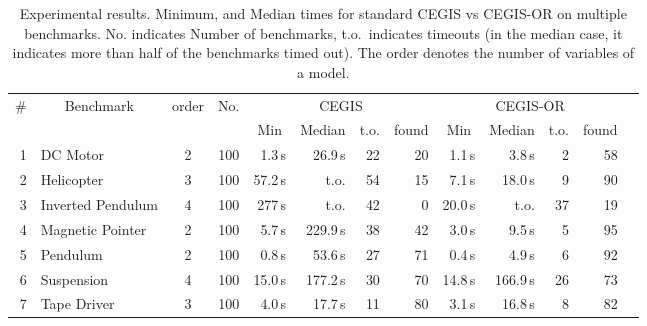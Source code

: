 \documentclass[sigconf]{llncs}
\begin{document}
\begin{table}
\centering
\footnotesize
%
\begin{tabular}{| r | l | c | c | r | r | r | r | r | r | r | r | r |}
%
\hline
\# & \multicolumn{1}{|c|}{Benchmark} & \multicolumn{1}{|c|}{order} & \multicolumn{1}{|c|}{No.} & \multicolumn{4}{|c|}{CEGIS} & \multicolumn{4}{|c|}{CEGIS-OR} \\
   &                                 & & \multicolumn{1}{|c|}{}  & \multicolumn{1}{|c|}{Min} & \multicolumn{1}{|c|}{Median} & \multicolumn{1}{|c|}{t.o.} & \multicolumn{1}{|c|}{found} & \multicolumn{1}{|c|}{Min} & \multicolumn{1}{|c|}{Median} & \multicolumn{1}{|c|}{t.o.} & \multicolumn{1}{|c|}{found}\\\hline
1  & DC Motor          & 2 & 100 & 1.3\,s & 26.9\,s& 22& 20& 1.1\,s &   3.8\,s & 2 & 58\\
2  & Helicopter        & 3  & 100 & 57.2\,s & t.o. & 54 & 15 & 7.1\,s  &   18.0\,s & 9 & 90\\
3  & Inverted Pendulum & 4 & 100 &  277\,s& t.o. & 42& 0 & 20.0\,s  &  t.o. & 37 & 19\\
4  & Magnetic Pointer  & 2  & 100 & 5.7\,s & 229.9\,s & 38 & 42 & 3.0\,s  &  9.5\,s & 5 & 95 \\
5  & Pendulum          & 2 & 100 & 0.8\,s & 53.6\,s & 27 & 71 &0.4\,s  &   4.9\,s & 6 & 92\\
6  & Suspension        & 4 & 100 &15.0\,s & 177.2\,s & 30 & 70 & 14.8\,s&166.9\,s  & 26 & 73\\
7  & Tape Driver       & 3 & 100 & 4.0\,s& 17.7\,s & 11 & 80 &3.1\,s  &   16.8\,s & 8 & 82\\
\hline
%
\end{tabular}
\vspace{0.05in}
\caption{\label{tab:cegis_results}
Experimental results. Minimum, and Median times for standard CEGIS vs CEGIS-OR on multiple benchmarks. No. indicates Number of benchmarks,
 t.o.~indicates timeouts (in the median case, it indicates more than half of the benchmarks timed out). The order denotes the number of variables of a model.}
\end{table}
\end{document}
